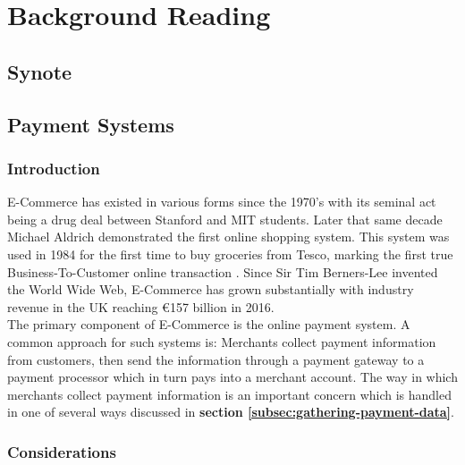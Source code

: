 \chapter{Background Reading}
\label{chap:background-reading}

\section{Synote}
\label{sec:synote}

\section{Payment Systems}
\label{sec:payment-systems}



\subsection{Introduction}
\label{sec:payment-intro}

E-Commerce has existed in various forms since the 1970's with its seminal act being a drug deal between Stanford and MIT students\cite{power-mike-online-highs}. Later that same decade Michael Aldrich demonstrated the first online shopping system. This system was used in 1984 for the first time to buy groceries from Tesco, marking the first true Business-To-Customer online transaction \cite{winterman-kelly-online-shopper}. Since Sir Tim Berners-Lee invented the World Wide Web, E-Commerce has grown substantially with industry revenue in the UK reaching \euro{157 billion} in 2016\cite{khaksar-2016}.\\

The primary component of E-Commerce is the online payment system. A common approach for such systems is: Merchants collect payment information from customers, then send the information through a payment gateway to a payment processor which in turn pays into a merchant account. The way in which merchants collect payment information is an important concern which is handled in one of several ways discussed in \textbf{section \ref{subsec:gathering-payment-data}}.

\subsection{Considerations}
\label{subsec:considerations}

